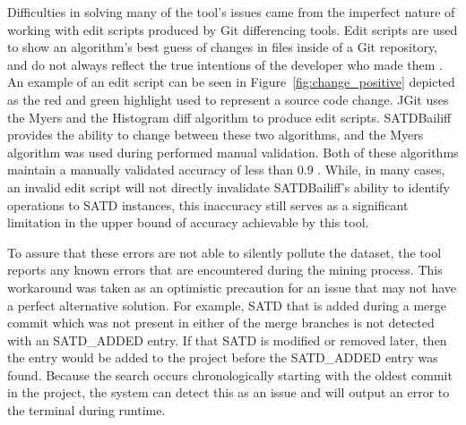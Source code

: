 \documentclass[3p]{elsarticle}
\newcommand{\approach}{SATDBailiff\xspace}
\begin{document}
Difficulties in solving many of the tool's issues came from the imperfect nature of working with edit scripts produced by Git differencing tools. Edit scripts are used to show an algorithm's best guess of changes in files inside of a Git repository, and do not always reflect the true intentions of the developer who made them \cite{Frick}. An example of an edit script can be seen in Figure~\ref{fig:change_positive} depicted as the red and green highlight used to represent a source code change. JGit uses the Myers \cite{Myers} and the Histogram \cite{Histogram} diff algorithm to produce edit scripts. \approach provides the ability to change between these two algorithms, and the Myers algorithm was used during performed manual validation. Both of these algorithms maintain a manually validated accuracy of less than 0.9 \cite{Frick}. While, in many cases, an invalid edit script will not directly invalidate \approach's ability to identify operations to SATD instances, this inaccuracy still serves as a significant limitation in the upper bound of accuracy achievable by this tool.

To assure that these errors are not able to silently pollute the dataset, the tool reports any known errors that are encountered during the mining process.
This workaround was taken as an optimistic precaution for an issue that may not have a perfect alternative solution.
For example, SATD that is added during a merge commit which was not present in either of the merge branches is not detected with an SATD\_ADDED entry. If that SATD is modified or removed later, then the entry would be added to the project before the SATD\_ADDED entry was found. Because the search occurs chronologically starting with the oldest commit in the project, the system can detect this as an issue and will output an error to the terminal during runtime.
\end{document}
